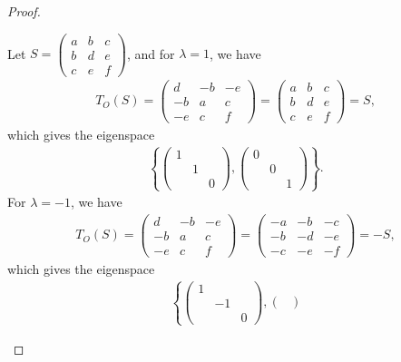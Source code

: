 \documentclass[10pt]{book}
\theoremstyle{definition}
\numberwithin{equation}{chapter}
\begin{document}
\begin{proof}
\begin{enumerate}[label=(\alph*)]
    Let $S = \begin{pmatrix}
        a & b & c \\
        b & d & e \\
        c & e & f
    \end{pmatrix}$, and for $\lambda = 1$, we have
    \begin{align*}
        T_O(S) = \begin{pmatrix}
        d & -b & -e \\
        -b & a & c \\
        -e & c & f
    \end{pmatrix} = \begin{pmatrix}
        a & b & c \\
        b & d & e \\
        c & e & f
    \end{pmatrix} = S,
    \end{align*}
    which gives the eigenspace
    \begin{align*}
        \left\{\begin{pmatrix}
        1 & &  \\
        & 1 &  \\
        & & 0
    \end{pmatrix}, \begin{pmatrix}
        0 & &  \\
        & 0 &  \\
        & & 1
    \end{pmatrix}\right\}.
    \end{align*}
    For $\lambda = -1$, we have
    \begin{align*}
        T_O(S) = \begin{pmatrix}
        d & -b & -e \\
        -b & a & c \\
        -e & c & f
    \end{pmatrix} = \begin{pmatrix}
        -a & -b & -c \\
        -b & -d & -e \\
        -c & -e & -f
    \end{pmatrix} = -S,
    \end{align*}
    which gives the eigenspace
    \begin{align*}
        \left\{\begin{pmatrix}
        1 & &  \\
        & -1 &  \\
        & & 0
    \end{pmatrix}, \begin{pmatrix}

\end{pmatrix}
\end{align*}
\end{enumerate}
\end{proof}
\end{document}

